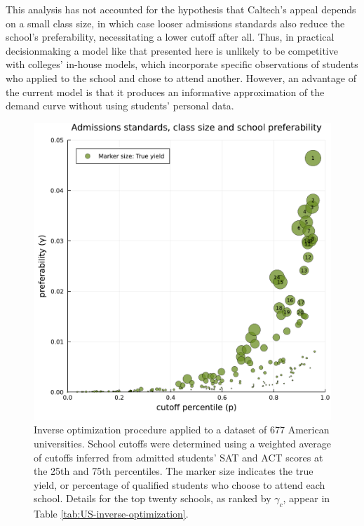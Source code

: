 \documentclass[12pt]{article}
\numberwithin{equation}{subsection}
\theoremstyle{definition}
\begin{document}
This analysis has not accounted for the hypothesis that Caltech's appeal depends on a small class size, in which case looser admissions standards also reduce the school's preferability, necessitating a lower cutoff after all. Thus, in practical decisionmaking a model like that presented here is unlikely to be competitive with colleges' in-house models, which incorporate specific observations of students who applied to the school and chose to attend another. However, an advantage of the current model is that it produces an informative approximation of the demand curve without using students' personal data. %

\begin{figure}
\begin{center}\includegraphics[width=\linewidth, ]{plots/US-cutoff-gamma.pdf}\end{center}
\captionsetup{singlelinecheck=off}
    \caption[.]{Inverse optimization procedure applied to a dataset of 677 American universities. School cutoffs were determined using a weighted average of cutoffs inferred from admitted students' SAT and ACT scores at the 25th and 75th percentiles. The marker size indicates the true yield, or percentage of qualified students who choose to attend each school. Details for the top twenty schools, as ranked by $\gamma_c$, appear in Table \ref{tab:US-inverse-optimization}.}
\label{US-cutoff-gamma}
\end{figure}
\end{document}
